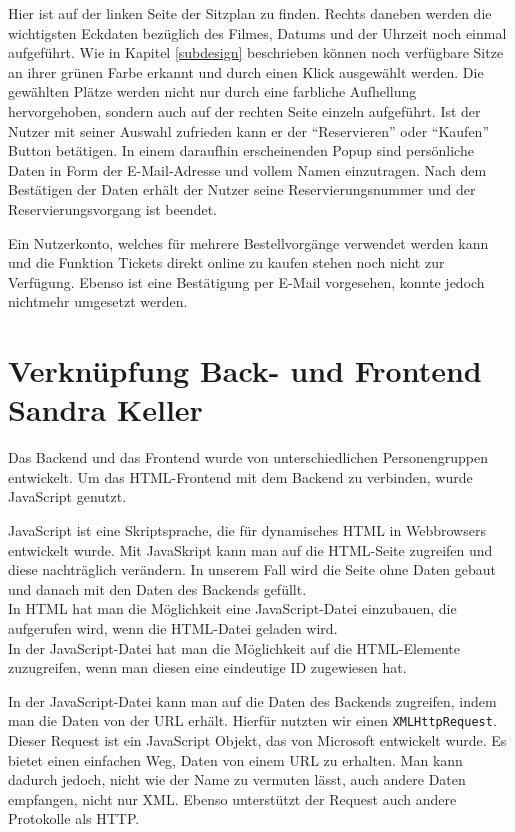 	Hier ist auf der linken Seite der Sitzplan zu finden. Rechts daneben werden die wichtigsten Eckdaten bezüglich des Filmes, Datums und der Uhrzeit noch einmal aufgeführt. Wie in Kapitel \vref{subdesign} beschrieben können noch verfügbare Sitze an ihrer grünen Farbe erkannt und durch einen Klick ausgewählt werden. Die gewählten Plätze werden nicht nur durch eine farbliche Aufhellung hervorgehoben, sondern auch auf der rechten Seite einzeln aufgeführt. Ist der Nutzer mit seiner Auswahl zufrieden kann er der \enquote{Reservieren} oder \enquote{Kaufen} Button betätigen. In einem daraufhin erscheinenden Popup sind persönliche Daten in Form der E-Mail-Adresse und vollem Namen einzutragen. Nach dem Bestätigen der Daten erhält der Nutzer seine Reservierungsnummer und der Reservierungsvorgang ist beendet.
	
	Ein Nutzerkonto, welches für mehrere Bestellvorgänge verwendet werden kann und die Funktion Tickets direkt online zu kaufen stehen noch nicht zur Verfügung. Ebenso ist eine Bestätigung per E-Mail vorgesehen, konnte jedoch nichtmehr umgesetzt werden. 
	
	
	\section[Verknüpfung Back- und Frontend]{Verknüpfung Back- und Frontend {\hfill \normalsize Sandra Keller}}
	Das Backend und das Frontend wurde von unterschiedlichen Personengruppen entwickelt. Um das \ac{HTML}-Frontend mit dem Backend zu verbinden, wurde JavaScript genutzt. 
	
	JavaScript ist eine Skriptsprache, die für dynamisches \ac{HTML} in Webbrowsers entwickelt wurde. Mit JavaSkript kann man auf die \ac{HTML}-Seite zugreifen und diese nachträglich verändern. In unserem Fall wird die Seite ohne Daten gebaut und danach mit den Daten des Backends gefüllt.
	\\In \ac{HTML} hat man die Möglichkeit eine JavaScript-Datei einzubauen, die aufgerufen wird, wenn die HTML-Datei geladen wird. 
	\\In der JavaScript-Datei hat man die Möglichkeit auf die \ac{HTML}-Elemente zuzugreifen, wenn man diesen eine eindeutige \ac{ID} zugewiesen hat. 

	
	In der JavaScript-Datei kann man auf die Daten des Backends zugreifen, indem man die Daten von der \ac{URL} erhält. Hierfür nutzten wir einen \texttt{XMLHttpRequest}. Dieser Request ist ein JavaScript Objekt, das von Microsoft entwickelt wurde. Es bietet einen einfachen Weg, Daten von einem \ac{URL} zu erhalten. Man kann dadurch jedoch, nicht wie der Name zu vermuten lässt, auch andere Daten empfangen, nicht nur XML. Ebenso unterstützt der Request auch andere Protokolle als \ac{HTTP}.
	
